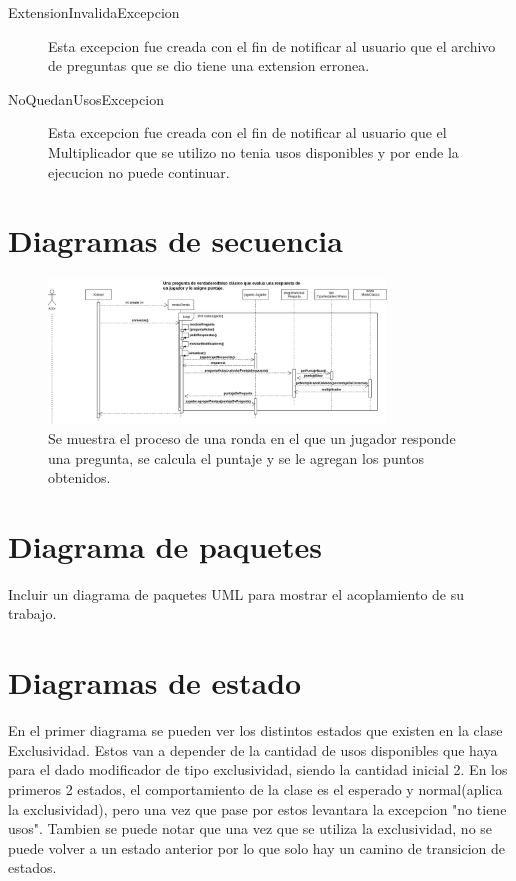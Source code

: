 \documentclass[titlepage,a4paper]{article}
\begin{document}
\begin{description}
\item[ExtensionInvalidaExcepcion] Esta excepcion fue creada con el fin de notificar al usuario que el archivo de preguntas que se dio tiene una extension erronea.
\item[NoQuedanUsosExcepcion] Esta excepcion fue creada con el fin de notificar al usuario que el Multiplicador que se utilizo no tenia usos disponibles y por ende la ejecucion no puede continuar.
\end{description}

\section{Diagramas de secuencia}\label{sec:diagramasdesecuencia}

\begin{figure}[H]
\centering
\includegraphics[width=0.8\textwidth]{diagramaDeSecuencia.png}
\caption{\label{fig:seq01}Se muestra el proceso de una ronda en el que un jugador responde una pregunta, se calcula el puntaje y se le agregan los puntos obtenidos.}
\end{figure}

\section{Diagrama de paquetes}\label{sec:diagramasdepaquetes}

Incluir un diagrama de paquetes UML para mostrar el acoplamiento de su trabajo.

\section{Diagramas de estado}\label{sec:diagramasdeestados}

En el primer diagrama se pueden ver los distintos estados que existen en la clase Exclusividad. Estos van a depender de la cantidad de usos disponibles que haya para el dado modificador de tipo exclusividad, siendo la cantidad inicial 2. En los primeros 2 estados, el comportamiento de la clase es el esperado y normal(aplica la exclusividad), pero una vez que pase por estos levantara la  excepcion "no tiene usos".
Tambien se puede notar que una vez que se utiliza la exclusividad, no se puede volver a un estado anterior por lo que solo hay un camino de transicion de estados.
\end{document}
